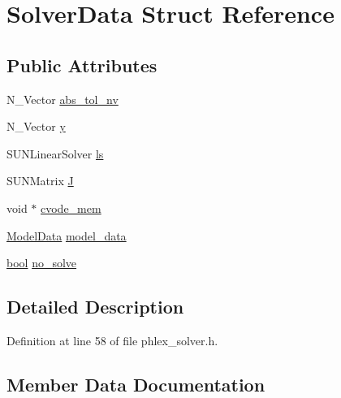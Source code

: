 \hypertarget{struct_solver_data}{}\section{Solver\+Data Struct Reference}
\label{struct_solver_data}
\subsection*{Public Attributes}
\begin{DoxyCompactItemize}
\item 
N\+\_\+\+Vector \mbox{\hyperlink{struct_solver_data_acfa983d9523ca3e04a1e4cc51e010d46}{abs\+\_\+tol\+\_\+nv}}
\item 
N\+\_\+\+Vector \mbox{\hyperlink{struct_solver_data_afb75942e94dd84088c7ea98b2b34249b}{y}}
\item 
S\+U\+N\+Linear\+Solver \mbox{\hyperlink{struct_solver_data_a02d8b68a97c3bfd56f935c18820bf9c6}{ls}}
\item 
S\+U\+N\+Matrix \mbox{\hyperlink{struct_solver_data_a0c76c01fb6686764f834ba6c7d67f2a0}{J}}
\item 
void $\ast$ \mbox{\hyperlink{struct_solver_data_af214123f600541c13da1881003c9f20b}{cvode\+\_\+mem}}
\item 
\mbox{\hyperlink{struct_model_data}{Model\+Data}} \mbox{\hyperlink{struct_solver_data_addacaed7357d35a1c6f521a86845121d}{model\+\_\+data}}
\item 
\mbox{\hyperlink{phlex__solver_8h_af6a258d8f3ee5206d682d799316314b1}{bool}} \mbox{\hyperlink{struct_solver_data_a1cb9c841b43b83f5b203419388fc45d5}{no\+\_\+solve}}
\end{DoxyCompactItemize}


\subsection{Detailed Description}


Definition at line 58 of file phlex\+\_\+solver.\+h.



\subsection{Member Data Documentation}
\mbox{\label{struct_solver_data_acfa983d9523ca3e04a1e4cc51e010d46}} 
